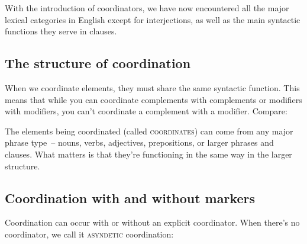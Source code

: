 \ea \label{ex:coord-meaning}
    \z
\z
{}

With the introduction of coordinators, we have now encountered all the major lexical categories in English except for interjections, as well as the main syntactic functions they serve in clauses.

\subsection{The structure of coordination}

When we coordinate elements, they must share the same syntactic function. This means that while you can coordinate complements with complements or modifiers with modifiers, you can't coordinate a complement with a modifier. Compare:

\ea \label{ex:coord-function}
    \z
\z

The elements being coordinated (called \textsc{coordinates}) can come from any major phrase type~-- nouns, verbs, adjectives, prepositions, or larger phrases and clauses. What matters is that they're functioning in the same way in the larger structure.

\subsection{Coordination with and without markers}

Coordination can occur with or without an explicit coordinator. When there's no coordinator, we call it \textsc{asyndetic} coordination:

\ea \label{ex:coord-marking}
    \z
\z

